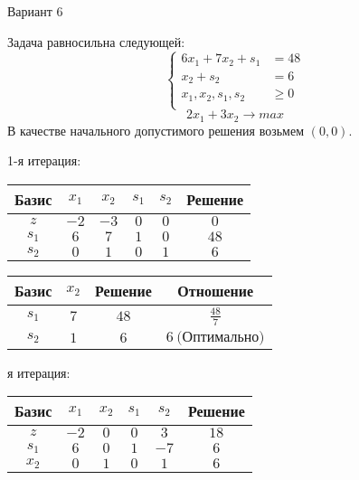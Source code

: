 \documentclass{article}%
\begin{document}
\newpage%
\begin{center}%
\begin{Huge}%
Вариант 6%
\end{Huge}%
\end{center}%
Задача равносильна следующей: %
\[%
\left\{\begin{aligned}6x_{1}+7x_{2}+s_{1} & =48 \\x_{2}+s_{2} & =6 \\x_{1},x_{2},s_{1},s_{2} & \ge 0 \\ \end{aligned}\right.%
\]%
\[%
2x_{1}+3x_{2}  \to max%
\]%
В качестве начального допустимого решения возьмем %
$(0, 0).$%
\begin{flushleft}%
1{-}я итерация: %
\newline%
\newline%
\renewcommand{\arraystretch}{1.3}%
\begin{tabular}{|c|cccc|c|}%
\hline%
Базис&$x_{1}$&$x_{2}$&$s_{1}$&$s_{2}$&Решение\\%
\hline%
$z$&$-2$&$-3$&$0$&$0$&$0$\\%
\hline%
$s_{1}$&$6$&$7$&$1$&$0$&$48$\\%
$s_{2}$&$0$&$1$&$0$&$1$&$6$\\%
\hline%
\end{tabular}%
\newline%
\newline%
\newline%
\begin{tabular}{|cccc|}%
\hline%
Базис&$x_{2}$&Решение&Отношение\\%
\hline%
$s_{1}$&$7$&$48$&$\frac{48}{7}$\\%
$s_{2}$&$1$&$6$&$6\: \text{(Оптимально)}$\\%
\hline%
\end{tabular}%
\newline%
\newline%
я итерация: %
\newline%
\newline%
\renewcommand{\arraystretch}{1.3}%
\begin{tabular}{|c|cccc|c|}%
\hline%
Базис&$x_{1}$&$x_{2}$&$s_{1}$&$s_{2}$&Решение\\%
\hline%
$z$&$-2$&$0$&$0$&$3$&$18$\\%
\hline%
$s_{1}$&$6$&$0$&$1$&$-7$&$6$\\%
$x_{2}$&$0$&$1$&$0$&$1$&$6$\\%
\hline%

\end{tabular}
\end{flushleft}
\end{document}

